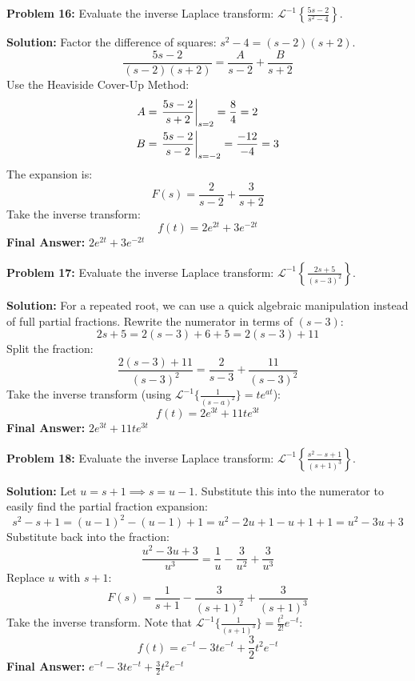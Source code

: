 \documentclass[11pt, letterpaper]{article}
\theoremstyle{definition}
\theoremstyle{remark}
\begin{document}
\vspace{1em}

\textbf{Problem 16:} Evaluate the inverse Laplace transform: $\displaystyle \mathcal{L}^{-1} \left\{ \frac{5s - 2}{s^2 - 4} \right\}$.

\textbf{Solution:}
Factor the difference of squares: $s^2 - 4 = (s-2)(s+2)$.
\[
\frac{5s - 2}{(s-2)(s+2)} = \frac{A}{s-2} + \frac{B}{s+2}
\]
Use the Heaviside Cover-Up Method:
\begin{align*}
A &= \left. \frac{5s - 2}{s+2} \right|_{s=2} = \frac{8}{4} = 2 \\ \relax
B &= \left. \frac{5s - 2}{s-2} \right|_{s=-2} = \frac{-12}{-4} = 3
\end{align*}
The expansion is:
\[
F(s) = \frac{2}{s-2} + \frac{3}{s+2}
\]
Take the inverse transform:
\[
f(t) = 2e^{2t} + 3e^{-2t}
\]
\textbf{Final Answer:} $\displaystyle 2e^{2t} + 3e^{-2t}$

\vspace{1em}

\textbf{Problem 17:} Evaluate the inverse Laplace transform: $\displaystyle \mathcal{L}^{-1} \left\{ \frac{2s + 5}{(s-3)^2} \right\}$.

\textbf{Solution:}
For a repeated root, we can use a quick algebraic manipulation instead of full partial fractions. Rewrite the numerator in terms of $(s-3)$:
\[
2s + 5 = 2(s-3) + 6 + 5 = 2(s-3) + 11
\]
Split the fraction:
\[
\frac{2(s-3) + 11}{(s-3)^2} = \frac{2}{s-3} + \frac{11}{(s-3)^2}
\]
Take the inverse transform (using $\mathcal{L}^{-1}\{\frac{1}{(s-a)^2}\} = te^{at}$):
\[
f(t) = 2e^{3t} + 11te^{3t}
\]
\textbf{Final Answer:} $\displaystyle 2e^{3t} + 11te^{3t}$

\vspace{1em}

\textbf{Problem 18:} Evaluate the inverse Laplace transform: $\displaystyle \mathcal{L}^{-1} \left\{ \frac{s^2 - s + 1}{(s+1)^3} \right\}$.

\textbf{Solution:}
Let $u = s+1 \implies s = u-1$. Substitute this into the numerator to easily find the partial fraction expansion:
\[
s^2 - s + 1 = (u-1)^2 - (u-1) + 1 = u^2 - 2u + 1 - u + 1 + 1 = u^2 - 3u + 3
\]
Substitute back into the fraction:
\[
\frac{u^2 - 3u + 3}{u^3} = \frac{1}{u} - \frac{3}{u^2} + \frac{3}{u^3}
\]
Replace $u$ with $s+1$:
\[
F(s) = \frac{1}{s+1} - \frac{3}{(s+1)^2} + \frac{3}{(s+1)^3}
\]
Take the inverse transform. Note that $\mathcal{L}^{-1}\{\frac{1}{(s+1)^3}\} = \frac{t^2}{2!}e^{-t}$:
\[
f(t) = e^{-t} - 3te^{-t} + \frac{3}{2}t^2e^{-t}
\]
\textbf{Final Answer:} $\displaystyle e^{-t} - 3te^{-t} + \frac{3}{2}t^2e^{-t}$
\end{document}
